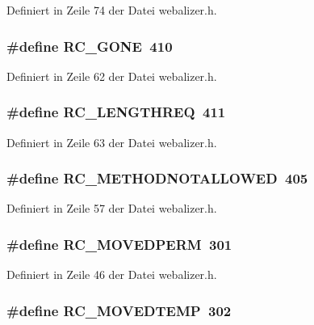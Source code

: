 Definiert in Zeile 74 der Datei webalizer.h.
\subsubsection{\setlength{\rightskip}{0pt plus 5cm}\#define RC\_\-GONE~410}\label{webalizer_8h_e3c00160efe3330657c85c15d047490c}




Definiert in Zeile 62 der Datei webalizer.h.
\subsubsection{\setlength{\rightskip}{0pt plus 5cm}\#define RC\_\-LENGTHREQ~411}\label{webalizer_8h_d8e34c952fc0f159e05586be6444fd7e}




Definiert in Zeile 63 der Datei webalizer.h.
\subsubsection{\setlength{\rightskip}{0pt plus 5cm}\#define RC\_\-METHODNOTALLOWED~405}\label{webalizer_8h_aefe9210427876578c52b3d1b9585d26}




Definiert in Zeile 57 der Datei webalizer.h.
\subsubsection{\setlength{\rightskip}{0pt plus 5cm}\#define RC\_\-MOVEDPERM~301}\label{webalizer_8h_377e76f0029c632db82eeed9ca566170}




Definiert in Zeile 46 der Datei webalizer.h.
\subsubsection{\setlength{\rightskip}{0pt plus 5cm}\#define RC\_\-MOVEDTEMP~302}\label{webalizer_8h_c68cd020d1f6ac6c183545ac2ddedac4}




